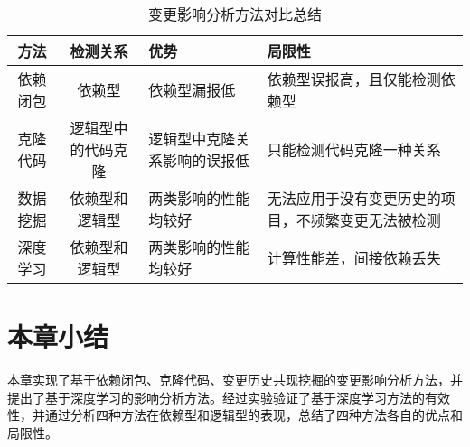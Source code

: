 \begin{table}[htbp]
\caption{变更影响分析方法对比总结}
\vspace{0.5em}\centering\wuhao
\begin{tabular}{ccp{4cm}p{4cm}}
\toprule
方法& 检测关系 & 优势 & 局限性\\
\midrule
依赖闭包 & 依赖型 & 依赖型漏报低 & 依赖型误报高，且仅能检测依赖型\\
克隆代码 & 逻辑型中的代码克隆 & 逻辑型中克隆关系影响的误报低 & 只能检测代码克隆一种关系\\
数据挖掘  & 依赖型和逻辑型 & 两类影响的性能均较好 & 无法应用于没有变更历史的项目，不频繁变更无法被检测 \\
深度学习  & 依赖型和逻辑型 & 两类影响的性能均较好 & 计算性能差，间接依赖丢失 \\
\bottomrule
\end{tabular}
\end{table}



\section{本章小结}

本章实现了基于依赖闭包、克隆代码、变更历史共现挖掘的变更影响分析方法，并提出了基于深度学习的影响分析方法。经过实验验证了基于深度学习方法的有效性，并通过分析四种方法在依赖型和逻辑型的表现，总结了四种方法各自的优点和局限性。


